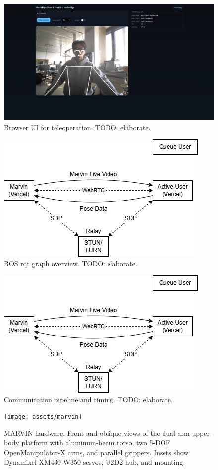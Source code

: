 \documentclass[manuscript,screen]{acmart} %
\begin{document}
\begin{figure}[htbp]
  \centering
  \includegraphics[width=0.5\linewidth]{assets/web-ui}
  \caption{Browser UI for teleoperation. TODO: elaborate.}
  \label{fig:ui}
\end{figure}

\begin{figure}[htbp]
  \centering
  \includegraphics[width=0.5\linewidth]{assets/system-diagram}
  \caption{ROS rqt graph overview. TODO: elaborate.}
  \label{fig:system}
\end{figure}

\begin{figure}[htbp]
  \centering
  \includegraphics[width=0.5\linewidth]{assets/system-diagram.png}
  \caption{Communication pipeline and timing. TODO: elaborate.}
  \label{fig:pipeline}
\end{figure}

\begin{figure}[htbp]
  \centering
  \texttt{[image: assets/marvin]}
  \caption{MARVIN hardware. Front and oblique views of the dual-arm upper-body platform with aluminum-beam torso, two 5-DOF OpenManipulator-X arms, and parallel grippers. Insets show Dynamixel XM430-W350 servos, U2D2 hub, and mounting.}
  \label{fig:photos}
\end{figure}
\end{document}
